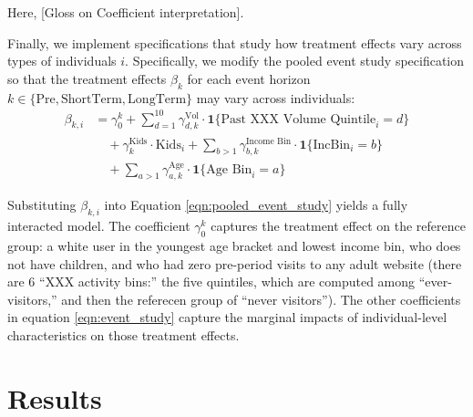 Here, [Gloss on Coefficient interpretation].

Finally, we implement specifications that study how treatment effects vary across types of individuals $i$. Specifically, we modify the pooled event study specification so that the treatment effects $\beta_{k}$ for each event horizon $k \in \{\text{Pre}, \text{ShortTerm}, \text{LongTerm}\}$ may vary across individuals:
\begin{align}
    \beta_{k,i} &= \gamma_{0}^{k} + \sum_{d=1}^{10} \gamma^{\text{Vol}}_{d,k} \cdot \mathbf{1}\{\text{Past XXX Volume Quintile}_i = d\} \nonumber \\ %
    &\quad + \gamma^{\text{Kids}}_{k} \cdot \text{Kids}_i + \sum_{b > 1} \gamma^{\text{Income Bin}}_{b,k} \cdot \mathbf{1}\{\text{IncBin}_i = b\} \nonumber \\
    &\quad %
    + \sum_{a > 1} \gamma^{\text{Age}}_{a,k} \cdot \mathbf{1}\{\text{Age Bin}_i = a\}
\label{eqn:heterogeneity}
\end{align}

Substituting $\beta_{k,i}$ into Equation \ref{eqn:pooled_event_study} yields a fully interacted model. The coefficient $\gamma_{0}^{k}$ captures the treatment effect on the reference group: a white user in the youngest age bracket and lowest income bin, who does not have children, and who had zero pre-period visits to any adult website (there are 6 ``XXX activity bins:'' the five quintiles, which are computed among ``ever-visitors,'' and then the referecen group of ``never visitors''). The other coefficients in equation \ref{eqn:event_study} capture the marginal impacts of individual-level characteristics on those treatment effects.

\section{Results}




